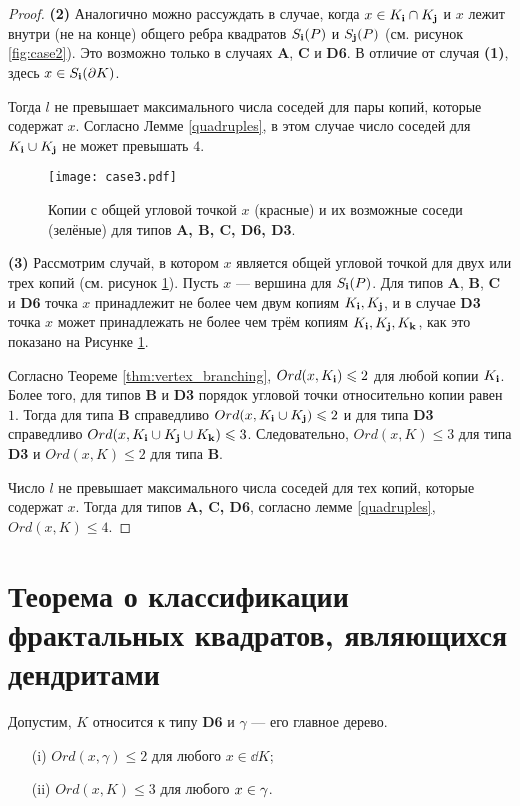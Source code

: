 \begin{proof}
\textbf{(2)} Аналогично можно рассуждать в случае, когда $x\in K_{\bf{i}}\cap K_{\bf{j}}$ и $x$ лежит внутри (не на конце) общего ребра квадратов $S_{\bf{i}}(P)$ и $S_{\bf{j}}(P)$ (см. рисунок \ref{fig:case2}).
Это возможно только в случаях \textbf{A}, \textbf{C} и \textbf{D6}.
В отличие от случая \textbf{(1)}, здесь $x\in S_{\bf{i}}(\partial K)$.

Тогда $l$ не превышает максимального числа соседей для пары копий, которые содержат $x$.
Согласно Лемме \ref{quadruples}, в этом случае число соседей для $K_{\bf{i}}\cup K_{\bf{j}}$ не может превышать $4$.

\begin{figure}[H]
\centering
\texttt{[image: case3.pdf]}
\caption{Копии с общей угловой точкой $x$ (красные) и их возможные соседи (зелёные) для типов {\bf A, B, C, D6, D3}.}
\label{fig:case3}
\end{figure}

\textbf{(3)} Рассмотрим случай, в котором $x$ является общей угловой точкой для двух или трех копий (см. рисунок \ref{fig:case3}).
Пусть $x$ --- вершина для $S_{\bf{i}}(P)$.
Для типов \textbf{A},  \textbf{B}, \textbf{C} и \textbf{D6} точка $x$ принадлежит не более чем двум копиям $K_{\bf{i}}, K_{\bf{j}}$, и в случае \textbf{D3} точка $x$ может принадлежать не более чем трём копиям $K_{\bf{i}}, K_{\bf{j}}, K_{\bf{k}}$, как это показано на Рисунке \ref{fig:case3}.

Согласно Теореме \ref{thm:vertex_branching}, $Ord(x,K_{\bf{i}})\leqslant2$ для любой копии $K_{\bf{i}}$.
Более того, для типов \textbf{B} и \textbf{D3} порядок угловой точки относительно копии равен $1$.
Тогда для типа \textbf{B} справедливо $Ord(x,K_{\bf{i}}\cup K_{\bf{j}})\leqslant2$ и для типа \textbf{D3} справедливо $Ord(x,K_{\bf{i}}\cup K_{\bf{j}}\cup K_{\bf{k}})\leqslant3$.
Следовательно, $Ord(x,K)\leq3$ для типа {\bf D3} и $Ord(x,K)\leq2$ для типа {\bf B}.

Число $l$ не превышает максимального числа соседей для тех копий, которые содержат $x$.
Тогда для типов {\bf A, C, D6}, согласно лемме \ref{quadruples}, $Ord(x,K)\leq4$.
\end{proof}



\section{Теорема о классификации фрактальных квадратов, являющихся дендритами}

\begin{proposition}\label{lem:d4bound}
Допустим, $K$ относится к типу {\bf D6} и $\gamma$ --- его главное дерево.
\begin{itemize}[nolistsep]
    \item[(i)] $Ord(x,\gamma)\leq2$ для любого $x\in\dd K$;
    \item[(ii)] $Ord(x,K)\leq3$ для любого $x\in\gamma$.
\end{itemize}
\end{proposition}

